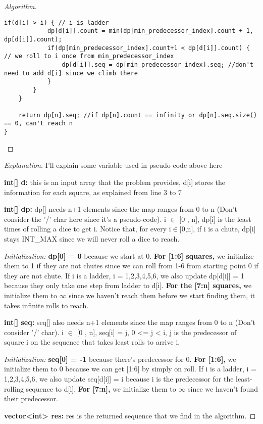 \documentclass[openany]{article}
\begin{document}
\begin{proof}[Algorithm]{}
\begin{lstlisting}[basicstyle=\fontsize{8}{9}\selectfont\ttfamily]
        if(d[i] > i) { // i is ladder
            dp[d[i]].count = min(dp[min_predecessor_index].count + 1, dp[d[i]].count);
            if(dp[min_predecessor_index].count+1 < dp[d[i]].count) { // we roll to i once from min_predecessor_index
                dp[d[i]].seq = dp[min_predecessor_index].seq; //don't need to add d[i] since we climb there
            }
        }
    }
    
    return dp[n].seq; //if dp[n].count == infinity or dp[n].seq.size() == 0, can't reach n
}
		\end{lstlisting} 
\end{proof}



\begin{proof}[Explanation]{}
		\renewcommand{\qedsymbol}{} %
        I'll explain some variable used in pseudo-code above here

        \textbf{int[] d:} this is an input array that the problem provides, d[i] stores the information for each square, as explained from line 3 to 7

        \textbf{int[] dp:} dp[] needs n+1 elements since the map ranges from 0 to n (Don't consider the '/' char here since it's a pseudo-code). i $\in$ [0 , n], dp[i] is the least times of rolling a dice to get i. Notice that, for every i$\in$[0,n], if i is a chute, dp[i] stays INT\_MAX since we will never roll a dice to reach. 
        
        \textit{Initialization:} \textbf{dp[0] = 0} because we start at 0. \textbf{For [1:6] squares,} we initialize them to 1 if they are not chutes since we can roll from 1-6 from starting point 0 if they are not chute. If i is a ladder, i = 1,2,3,4,5,6, we also update dp[d[i]] = 1 because they only take one step from ladder to d[i]. \textbf{For the [7:n] squares,} we initialize them to $\infty$ since we haven't reach them before we start finding them, it takes infinite rolls to reach. 

        \textbf{int[] seq:} seq[] also needs n+1 elements since the map ranges from 0 to n (Don't consider '/' char). i $\in$ [0 , n], seq[i] = j, 0 <= j < i, j is the predecessor of square i on the sequence that takes least rolls to arrive i. 
        
        \textit{Initialization:} \textbf{seq[0] = -1} because there's predecessor for 0. \textbf{For [1:6],} we initialize them to 0 because we can get [1:6] by simply on roll. If i is a ladder, i = 1,2,3,4,5,6, we also update seq[d[i]] = i because i is the predecessor for the least-rolling sequence to d[i]. \textbf{For [7:n],} we initialize them to $\infty$ since we haven't found their predecessor.

        \textbf{vector<int> res:} res is the returned sequence that we find in the algorithm.
\end{proof}
\end{document}
